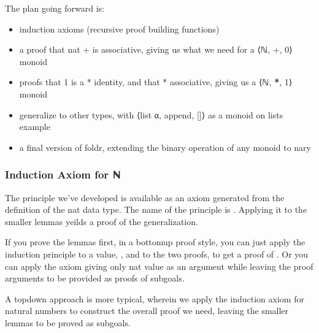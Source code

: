 \documentclass[letterpaper,10pt,english]{sphinxmanual}
\begin{document}
\sphinxAtStartPar
The plan going forward is:
\begin{itemize}
\item {} 
\sphinxAtStartPar
induction axioms (recursive proof building functions) 

\item {} 
\sphinxAtStartPar
a proof that nat + is associative, giving us what we need for a ⟨ℕ, +, 0⟩ monoid

\item {} 
\sphinxAtStartPar
proofs that 1 is a * identity, and that * associative, giving us a ⟨ℕ, {\color{red}\bfseries{}*}, 1⟩ monoid

\item {} 
\sphinxAtStartPar
generalize to other types, with ⟨list α, append, {[}{]}⟩ as a monoid on lists example

\item {} 
\sphinxAtStartPar
a final version of foldr, extending the binary operation of any monoid to n\sphinxhyphen{}ary

\end{itemize}


\subsubsection{Induction Axiom for ℕ}
\label{\detokenize{A_03_Recursive_Types:induction-axiom-for}}
\sphinxAtStartPar
The principle we’ve developed is available as an axiom
generated from the definition of the nat data type. The
name of the principle is . Applying it to the
smaller lemmas yeilds a proof of the generalization.

\sphinxAtStartPar
If you prove the lemmas first, in a bottom\sphinxhyphen{}up proof style,
you can just apply the induction principle to a value, ,
and to the two proofs, to get a proof of . Or you can
apply the axiom giving only nat value as an argument while
leaving the proof arguments to be provided as proofs of
subgoals.

\begin{sphinxVerbatim}[commandchars=\\\{\}]
 
\end{sphinxVerbatim}

\sphinxAtStartPar
A top\sphinxhyphen{}down approach is more typical, wherein we apply the
induction axiom for natural numbers to construct the overall
proof we need, leaving the smaller lemmas to be proved as
subgoals.
\end{document}
